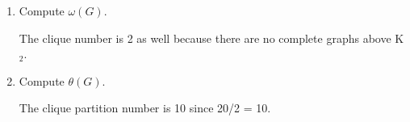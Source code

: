 \documentclass[11pt]{article}
\begin{document}
\begin{enumerate}[leftmargin=*]
\begin{enumerate}
        \begin{solution}
            The domination number is 2 because one odd vertex and one even vertex can be chosen. 
        \end{solution}
        \item Compute $\omega(G)$.
        \begin{solution}
            The clique number is 2 as well because there are no complete graphs above K$_2$. 
        \end{solution}
        \item Compute $\theta(G)$.
        \begin{solution}
            The clique partition number is 10 since 20/2 = 10.  
        \end{solution}
    \end{enumerate}


\end{enumerate}
\end{document}
